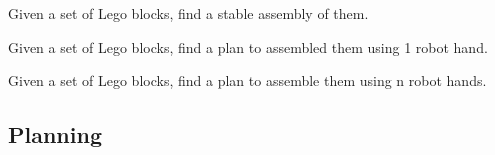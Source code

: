 \begin{gradedexercise}
  Given a set of Lego blocks, find a stable assembly of them.
\end{gradedexercise}

\begin{gradedexercise}
  Given a set of Lego blocks, find a plan to assembled them using 1 robot hand.
\end{gradedexercise}

\begin{gradedexercise}
  Given a set of Lego blocks, find a plan to assemble them using n robot hands.
\end{gradedexercise}

\subsection{Planning}



